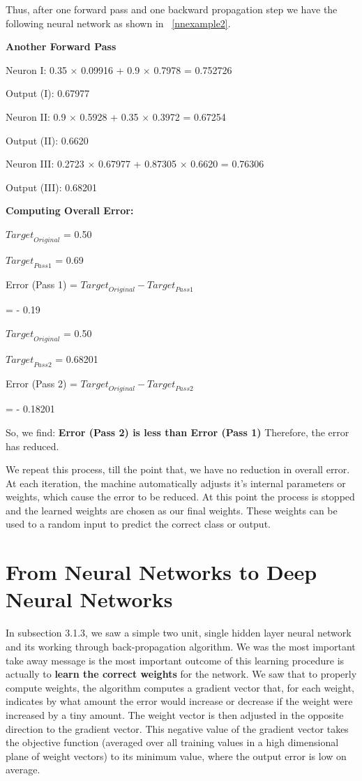 Thus, after one forward pass and one backward propagation step we have the following neural network as shown in ~\autoref{nnexample2}.
\newline
	
\textbf{Another Forward Pass}

Neuron I: 0.35  $\times$ 0.09916 + 0.9 $\times$ 0.7978 = 0.752726

Output (I): 0.67977  

Neuron II: 0.9 $\times$ 0.5928 + 0.35 $\times$ 0.3972 = 0.67254

Output (II): 0.6620

Neuron III: 0.2723 $\times$ 0.67977 + 0.87305 $\times$ 0.6620 = 0.76306

Output (III): 0.68201
\newline

\textbf{Computing Overall Error:}

${Target}_{Original}$ = 0.50

${Target}_{Pass 1}$ = 0.69

Error (Pass 1) = ${Target}_{Original} - {Target}_{Pass 1}$

= - 0.19

${Target}_{Original}$ = 0.50

${Target}_{Pass 2}$ = 0.68201

Error (Pass 2) = ${Target}_{Original} - {Target}_{Pass 2}$

= - 0.18201
\newline

So, we find: \textbf{Error (Pass 2)  is less than Error (Pass 1)} Therefore, the error has reduced.
\newline 

We repeat this process, till the point that, we have no reduction in overall error. At each iteration, the machine automatically adjusts it's internal parameters or weights, which cause the error to be reduced. At this point the process is stopped and the learned weights are chosen as our final weights. These weights can be used to a random input to predict the correct class or output.

\section{From Neural Networks to Deep Neural Networks}
In subsection 3.1.3, we saw a simple two unit, single hidden layer neural network and its working through back-propagation algorithm. We was the most important take away message is the most important outcome of this learning procedure is actually to \textbf{learn the correct weights} for the network. We saw that to properly compute weights, the algorithm computes a gradient vector that, for each weight, indicates by what amount the error would increase or decrease if the weight were increased by a tiny amount. The weight vector is then adjusted in the opposite direction to the gradient vector. This negative value of the gradient vector takes the objective function (averaged over all training values in a high dimensional plane of weight vectors) to its minimum value, where the output error is low on average.

